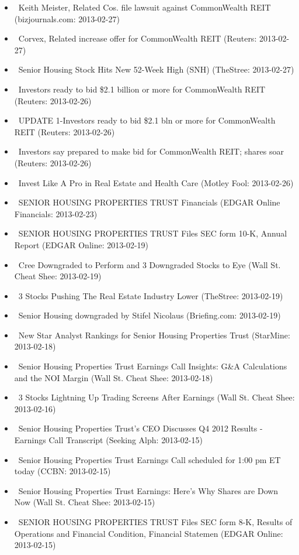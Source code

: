 \documentclass[11pt,asymmetric]{article}
\begin{document}
\begin{itemize}
\item\ Keith Meister, Related Cos. file lawsuit against CommonWealth REIT (bizjournals.com: 2013-02-27)
\item\ Corvex, Related increase offer for CommonWealth REIT (Reuters: 2013-02-27)
\item\ Senior Housing Stock Hits New 52-Week High (SNH) (TheStree: 2013-02-27)
\item\ Investors ready to bid \$2.1 billion or more for CommonWealth REIT (Reuters: 2013-02-26)
\item\ UPDATE 1-Investors ready to bid \$2.1 bln or more for CommonWealth REIT (Reuters: 2013-02-26)
\item\ Investors say prepared to make bid for CommonWealth REIT; shares soar (Reuters: 2013-02-26)
\item\ Invest Like A Pro in Real Estate and Health Care (Motley Fool: 2013-02-26)
\item\ SENIOR HOUSING PROPERTIES TRUST Financials (EDGAR Online Financials: 2013-02-23)
\item\ SENIOR HOUSING PROPERTIES TRUST Files SEC form 10-K, Annual Report (EDGAR Online: 2013-02-19)
\item\ Cree Downgraded to Perform and 3 Downgraded Stocks to Eye (Wall St. Cheat Shee: 2013-02-19)
\item\ 3 Stocks Pushing The Real Estate Industry Lower (TheStree: 2013-02-19)
\item\ Senior Housing downgraded by Stifel Nicolaus (Briefing.com: 2013-02-19)
\item\ New Star Analyst Rankings for Senior Housing Properties Trust (StarMine: 2013-02-18)
\item\ Senior Housing Properties Trust Earnings Call Insights: G\&A Calculations and the NOI Margin (Wall St. Cheat Shee: 2013-02-18)
\item\ 3 Stocks Lightning Up Trading Screens After Earnings (Wall St. Cheat Shee: 2013-02-16)
\item\ Senior Housing Properties Trust's CEO Discusses Q4 2012 Results - Earnings Call Transcript (Seeking Alph: 2013-02-15)
\item\ Senior Housing Properties Trust Earnings Call scheduled for 1:00 pm ET today (CCBN: 2013-02-15)
\item\ Senior Housing Properties Trust Earnings: Here’s Why Shares are Down Now (Wall St. Cheat Shee: 2013-02-15)
\item\ SENIOR HOUSING PROPERTIES TRUST Files SEC form 8-K, Results of Operations and Financial Condition, Financial Statemen (EDGAR Online: 2013-02-15)

\end{itemize}
\end{document}

